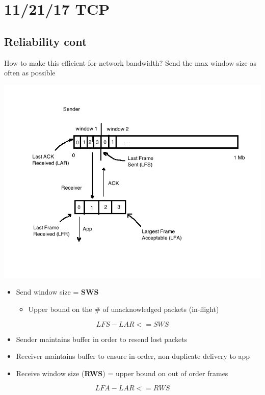 \documentclass[11pt]{article}
\begin{document}
\section{11/21/17 TCP}
\label{sec:orgheadline134}

\subsection{Reliability cont}
\label{sec:orgheadline129}
How to make this efficient for network bandwidth? Send the max window
size as often as possible

\includegraphics[width=.9\linewidth]{diagrams/flowcontrol.png}

\begin{itemize}
\item Send window size = \textbf{SWS}
\begin{itemize}
\item Upper bound on the \# of unacknowledged packets (in-flight)
\end{itemize}
\end{itemize}

\[LFS - LAR <= SWS\]

\begin{itemize}
\item Sender maintains buffer in order to resend lost packets
\item Receiver maintains buffer to ensure in-order, non-duplicate delivery
to app
\item Receive window size (\textbf{RWS}) = upper bound on out of order frames
\end{itemize}

\[LFA - LAR <= RWS\]
\end{document}
